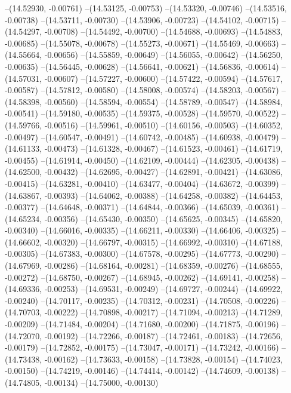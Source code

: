 --(14.52930, -0.00761)
--(14.53125, -0.00753)
--(14.53320, -0.00746)
--(14.53516, -0.00738)
--(14.53711, -0.00730)
--(14.53906, -0.00723)
--(14.54102, -0.00715)
--(14.54297, -0.00708)
--(14.54492, -0.00700)
--(14.54688, -0.00693)
--(14.54883, -0.00685)
--(14.55078, -0.00678)
--(14.55273, -0.00671)
--(14.55469, -0.00663)
--(14.55664, -0.00656)
--(14.55859, -0.00649)
--(14.56055, -0.00642)
--(14.56250, -0.00635)
--(14.56445, -0.00628)
--(14.56641, -0.00621)
--(14.56836, -0.00614)
--(14.57031, -0.00607)
--(14.57227, -0.00600)
--(14.57422, -0.00594)
--(14.57617, -0.00587)
--(14.57812, -0.00580)
--(14.58008, -0.00574)
--(14.58203, -0.00567)
--(14.58398, -0.00560)
--(14.58594, -0.00554)
--(14.58789, -0.00547)
--(14.58984, -0.00541)
--(14.59180, -0.00535)
--(14.59375, -0.00528)
--(14.59570, -0.00522)
--(14.59766, -0.00516)
--(14.59961, -0.00510)
--(14.60156, -0.00503)
--(14.60352, -0.00497)
--(14.60547, -0.00491)
--(14.60742, -0.00485)
--(14.60938, -0.00479)
--(14.61133, -0.00473)
--(14.61328, -0.00467)
--(14.61523, -0.00461)
--(14.61719, -0.00455)
--(14.61914, -0.00450)
--(14.62109, -0.00444)
--(14.62305, -0.00438)
--(14.62500, -0.00432)
--(14.62695, -0.00427)
--(14.62891, -0.00421)
--(14.63086, -0.00415)
--(14.63281, -0.00410)
--(14.63477, -0.00404)
--(14.63672, -0.00399)
--(14.63867, -0.00393)
--(14.64062, -0.00388)
--(14.64258, -0.00382)
--(14.64453, -0.00377)
--(14.64648, -0.00371)
--(14.64844, -0.00366)
--(14.65039, -0.00361)
--(14.65234, -0.00356)
--(14.65430, -0.00350)
--(14.65625, -0.00345)
--(14.65820, -0.00340)
--(14.66016, -0.00335)
--(14.66211, -0.00330)
--(14.66406, -0.00325)
--(14.66602, -0.00320)
--(14.66797, -0.00315)
--(14.66992, -0.00310)
--(14.67188, -0.00305)
--(14.67383, -0.00300)
--(14.67578, -0.00295)
--(14.67773, -0.00290)
--(14.67969, -0.00286)
--(14.68164, -0.00281)
--(14.68359, -0.00276)
--(14.68555, -0.00272)
--(14.68750, -0.00267)
--(14.68945, -0.00262)
--(14.69141, -0.00258)
--(14.69336, -0.00253)
--(14.69531, -0.00249)
--(14.69727, -0.00244)
--(14.69922, -0.00240)
--(14.70117, -0.00235)
--(14.70312, -0.00231)
--(14.70508, -0.00226)
--(14.70703, -0.00222)
--(14.70898, -0.00217)
--(14.71094, -0.00213)
--(14.71289, -0.00209)
--(14.71484, -0.00204)
--(14.71680, -0.00200)
--(14.71875, -0.00196)
--(14.72070, -0.00192)
--(14.72266, -0.00187)
--(14.72461, -0.00183)
--(14.72656, -0.00179)
--(14.72852, -0.00175)
--(14.73047, -0.00171)
--(14.73242, -0.00166)
--(14.73438, -0.00162)
--(14.73633, -0.00158)
--(14.73828, -0.00154)
--(14.74023, -0.00150)
--(14.74219, -0.00146)
--(14.74414, -0.00142)
--(14.74609, -0.00138)
--(14.74805, -0.00134)
--(14.75000, -0.00130)

